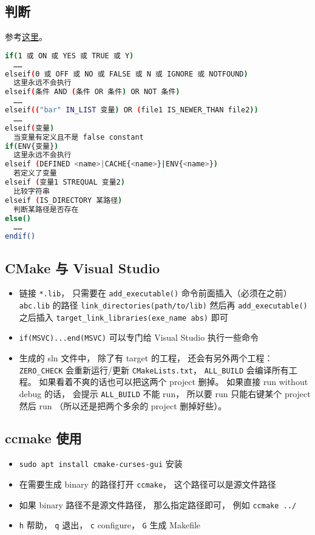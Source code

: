\subsection{判断}
参考\href{https://cmake.org/cmake/help/latest/command/if.html}{这里}。
\begin{lstlisting}[language=bash]
if(1 或 ON 或 YES 或 TRUE 或 Y)
  ……
elseif(0 或 OFF 或 NO 或 FALSE 或 N 或 IGNORE 或 NOTFOUND)
  这里永远不会执行
elseif(条件 AND (条件 OR 条件) OR NOT 条件)
  ……
elseif(("bar" IN_LIST 变量) OR (file1 IS_NEWER_THAN file2))
  ……
elseif(变量)
  当变量有定义且不是 false constant
if(ENV{变量})
  这里永远不会执行
elseif (DEFINED <name>|CACHE{<name>}|ENV{<name>})
  若定义了变量
elseif (变量1 STREQUAL 变量2)
  比较字符串
elseif (IS_DIRECTORY 某路径)
  判断某路径是否存在
else()
  ……
endif()
\end{lstlisting}

\subsection{CMake 与 Visual Studio}
\begin{itemize}
\item 链接 \verb`*.lib`， 只需要在 \verb`add_executable()` 命令前面插入（必须在之前） \verb`abc.lib` 的路径 \verb`link_directories(path/to/lib)` 然后再 \verb`add_executable()` 之后插入 \verb`target_link_libraries(exe_name abs)` 即可
\item \verb`if(MSVC)...end(MSVC)` 可以专门给 Visual Studio 执行一些命令
\item 生成的 sln 文件中， 除了有 target 的工程， 还会有另外两个工程： \verb`ZERO_CHECK` 会重新运行/更新 \verb`CMakeLists.txt`， \verb`ALL_BUILD` 会编译所有工程。 如果看着不爽的话也可以把这两个 project 删掉。 如果直接 run without debug 的话， 会提示 \verb`ALL_BUILD` 不能 run， 所以要 run 只能右键某个 project 然后 run （所以还是把两个多余的 project 删掉好些）。
\end{itemize}

\subsection{ccmake 使用}
\begin{itemize}
\item \verb`sudo apt install cmake-curses-gui` 安装
\item 在需要生成 binary 的路径打开 \verb`ccmake`， 这个路径可以是源文件路径
\item 如果 binary 路径不是源文件路径， 那么指定路径即可， 例如 \verb`ccmake ../`
\item \verb`h` 帮助， \verb`q` 退出， \verb`c` configure， \verb`G` 生成 Makefile
\end{itemize}
